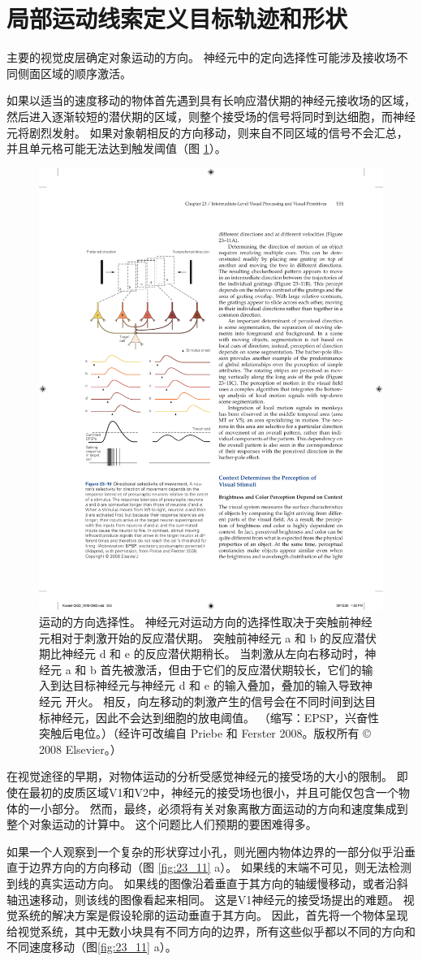 \section{局部运动线索定义目标轨迹和形状}

主要的视觉皮层确定对象运动的方向。 
神经元中的定向选择性可能涉及接收场不同侧面区域的顺序激活。


如果以适当的速度移动的物体首先遇到具有长响应潜伏期的神经元接收场的区域，然后进入逐渐较短的潜伏期的区域，则整个接受场的信号将同时到达细胞，而神经元将剧烈发射。 
如果对象朝相反的方向移动，则来自不同区域的信号不会汇总，并且单元格可能无法达到触发阈值（图 \ref{fig:23_10}）。

\begin{figure}[htbp]
	\centering
	\includegraphics[width=0.5\linewidth]{chap23/fig_23_10}
	\caption{运动的方向选择性。 神经元对运动方向的选择性取决于突触前神经元相对于刺激开始的反应潜伏期。 突触前神经元 a 和 b 的反应潜伏期比神经元 d 和 e 的反应潜伏期稍长。 当刺激从左向右移动时，神经元 a 和 b 首先被激活，但由于它们的反应潜伏期较长，它们的输入到达目标神经元与神经元 d 和 e 的输入叠加，叠加的输入导致神经元 开火。 相反，向左移动的刺激产生的信号会在不同时间到达目标神经元，因此不会达到细胞的放电阈值。 （缩写：EPSP，兴奋性突触后电位。）（经许可改编自 Priebe 和 Ferster 2008。版权所有 © 2008 Elsevier。）}
	\label{fig:23_10}
\end{figure}


在视觉途径的早期，对物体运动的分析受感觉神经元的接受场的大小的限制。 
即使在最初的皮质区域V1和V2中，神经元的接受场也很小，并且可能仅包含一个物体的一小部分。 
然而，最终，必须将有关对象离散方面运动的方向和速度集成到整个对象运动的计算中。 
这个问题比人们预期的要困难得多。


如果一个人观察到一个复杂的形状穿过小孔，则光圈内物体边界的一部分似乎沿垂直于边界方向的方向移动（图 \ref{fig:23_11} a）。 
如果线的末端不可见，则无法检测到线的真实运动方向。 
如果线的图像沿着垂直于其方向的轴缓慢移动，或者沿斜轴迅速移动，则该线的图像看起来相同。
这是V1神经元的接受场提出的难题。 
视觉系统的解决方案是假设轮廓的运动垂直于其方向。 
因此，首先将一个物体呈现给视觉系统，其中无数小块具有不同方向的边界，所有这些似乎都以不同的方向和不同速度移动（图\ref{fig:23_11} a）。

